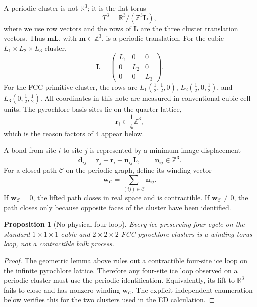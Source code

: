 \documentclass[11pt,letterpaper]{article}
\newcommand{\bd}{\bm d}
\newcommand{\bn}{\bm n}
\newcommand{\bL}{\bm L}
\newcommand{\br}{\bm r}
\newcommand{\bw}{\bm w}
\newcommand{\Z}{\mathbb Z}
\newcommand{\cycle}{\mathcal C}
\theoremstyle{plain}
\newtheorem{proposition}{Proposition}
\theoremstyle{definition}
\begin{document}
A periodic cluster is not $\mathbb R^3$; it is the flat torus
\begin{equation}
T^3=\mathbb R^3/(\Z^3\bL) ,
\end{equation}
where we use row vectors and the rows of $\bL$ are the three cluster
translation vectors.  Thus $\bm m\bL$, with $\bm m\in\Z^3$, is a periodic
translation.  For the cubic $L_1\times L_2\times L_3$ cluster,
\[
\bL=\begin{pmatrix}
L_1&0&0\\
0&L_2&0\\
0&0&L_3
\end{pmatrix}.
\]
For the FCC primitive cluster, the rows are
$L_1(\tfrac12,\tfrac12,0)$, $L_2(\tfrac12,0,\tfrac12)$, and
$L_3(0,\tfrac12,\tfrac12)$.  All coordinates in this note are measured in
conventional cubic-cell units.  The pyrochlore basis sites lie on the
quarter-lattice,
\[
\br_i\in \frac14\Z^3,
\]
which is the reason factors of $4$ appear below.

A bond
from site $i$ to site $j$ is represented by a minimum-image displacement
\begin{equation}
\bd_{ij}=\br_j-\br_i-\bn_{ij}\bL,
\qquad \bn_{ij}\in\Z^3 .
\end{equation}
For a closed path $\cycle$ on the periodic graph, define its winding vector
\begin{equation}
\bw_\cycle=\sum_{(ij)\in\cycle}\bn_{ij}.
\label{eq:winding}
\end{equation}
If $\bw_\cycle=0$, the lifted path closes in real space and is
contractible.  If $\bw_\cycle\ne0$, the path closes only because opposite
faces of the cluster have been identified.

\begin{proposition}[No physical four-loop]
Every ice-preserving four-cycle on the standard $1\times1\times1$ cubic
and $2\times2\times2$ FCC pyrochlore clusters is a winding torus loop, not
a contractible bulk process.
\end{proposition}

\begin{proof}
The geometric lemma above rules out a contractible four-site ice loop on
the infinite pyrochlore lattice.  Therefore any four-site ice loop observed
on a periodic cluster must use the periodic identification.  Equivalently,
its lift to $\mathbb R^3$ fails to close and has nonzero winding
$\bw_\cycle$.  The explicit independent enumeration below verifies this
for the two clusters used in the ED calculation.
\end{proof}
\end{document}
